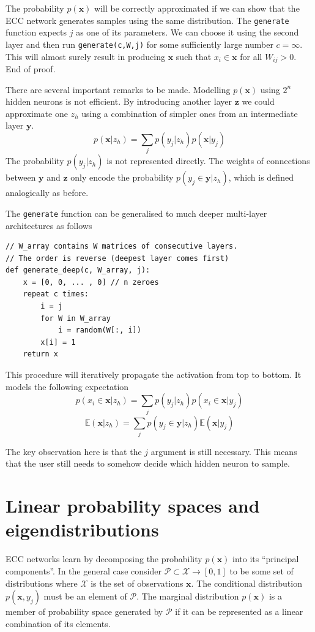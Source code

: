 \documentclass[12pt]{article}
\begin{document}
The probability $p(\boldsymbol{x})$ will be correctly approximated if we can show that the ECC network generates samples using the same distribution. The \texttt{generate} function expects $j$ as one of its parameters. We can choose it using the second layer and then run \texttt{generate(c,W,j)} for some sufficiently large number $c=\infty$. This will almost surely result in producing  $\boldsymbol{x}$ such that $x_i\in \boldsymbol{x}$ for all $W_{ij}>0$. End of proof. 

There are several important remarks to be made. Modelling $p(\boldsymbol{x})$ using $2^n$ hidden neurons is not efficient. By introducing another layer $\boldsymbol{z}$ we could approximate one $z_h$ using a combination of  simpler ones from an intermediate layer $\boldsymbol{y}$.
\[
p(\boldsymbol{x}|z_h) = \sum_{j} p(y_j|z_h) p(\boldsymbol{x}|y_j)
\] 
The probability $p(y_j|z_h)$ is not represented directly. The weights of connections between $\boldsymbol{y}$ and $\boldsymbol{z}$ only encode the probability $p(y_j\in \boldsymbol{y}|z_h)$, which is defined analogically as before. 

The \texttt{generate} function can be generalised to much deeper multi-layer architectures as follows
\begin{lstlisting}
// W_array contains W matrices of consecutive layers.
// The order is reverse (deepest layer comes first)
def generate_deep(c, W_array, j):
    x = [0, 0, ... , 0] // n zeroes
    repeat c times:
        i = j
        for W in W_array
            i = random(W[:, i])
        x[i] = 1
    return x
\end{lstlisting}
This procedure will iteratively propagate the activation from top to bottom. It models the following expectation
\[
p(x_i\in \boldsymbol{x}|z_h) = \sum_{j} p(y_j|z_h) p(x_i \in \boldsymbol{x}|y_j)
\]
\[
\mathbb{E}(\boldsymbol{x}|z_h) = \sum_{j} p(y_j\in \boldsymbol{y}|z_h) \mathbb{E}(\boldsymbol{x}|y_j)
\] 

The key observation here is that the $j$ argument is still necessary. This means that the user still needs to somehow decide which hidden neuron to sample.

 



\iffalse
\section{Linear probability spaces and eigendistributions}

ECC networks learn by decomposing the probability $p(\boldsymbol{x})$ into its ``principal components''.   In the general case consider  $\mathcal{P} \subset \mathcal{X} \rightarrow [0,1]$ to be some set of distributions where $\mathcal{X}$ is the set of observations $\boldsymbol{x}$. The conditional distribution $p(\boldsymbol{x},y_j)$ must be an element of $\mathcal{P}$. The marginal distribution $p(\boldsymbol{x})$ is a member of probability space generated by $\mathcal{P}$ if it can be represented as a linear combination of its elements.
\end{document}
